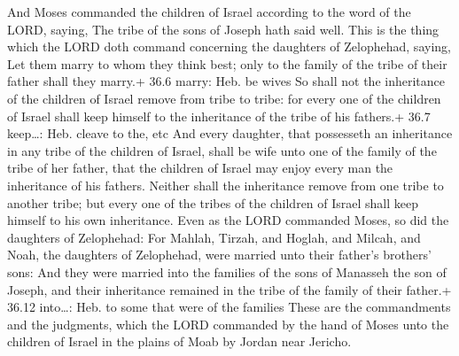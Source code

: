  And Moses commanded the children of Israel according to the
word of the LORD, saying, The tribe of the sons of Joseph hath said
well.  This is the thing which the LORD doth command
concerning the daughters of Zelophehad, saying, Let them marry to whom
they think best; only to the family of the tribe of their father shall
they marry.+ 36.6 marry: Heb. be wives  So shall not the
inheritance of the children of Israel remove from tribe to tribe: for
every one of the children of Israel shall keep himself to the
inheritance of the tribe of his fathers.+ 36.7 keep\ldots: Heb. cleave
to the, etc  And every daughter, that possesseth an
inheritance in any tribe of the children of Israel, shall be wife unto
one of the family of the tribe of her father, that the children of
Israel may enjoy every man the inheritance of his fathers. 
Neither shall the inheritance remove from one tribe to another tribe;
but every one of the tribes of the children of Israel shall keep himself
to his own inheritance.  Even as the LORD commanded Moses,
so did the daughters of Zelophehad:  For Mahlah, Tirzah,
and Hoglah, and Milcah, and Noah, the daughters of Zelophehad, were
married unto their father's brothers' sons:  And they were
married into the families of the sons of Manasseh the son of Joseph, and
their inheritance remained in the tribe of the family of their father.+
36.12 into\ldots: Heb. to some that were of the families 
These are the commandments and the judgments, which the LORD commanded
by the hand of Moses unto the children of Israel in the plains of Moab
by Jordan near Jericho.
